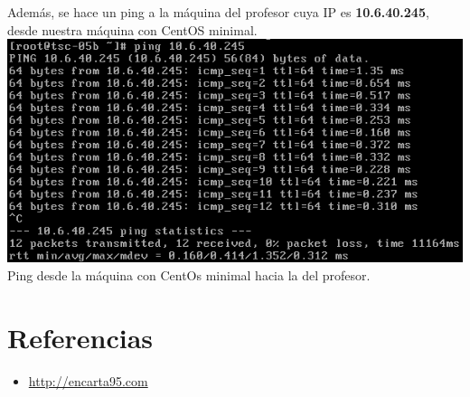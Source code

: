 \documentclass[11pt]{article}
\begin{document}
    Además, se hace un ping a la máquina del profesor cuya IP es \textbf{10.6.40.245}, desde nuestra máquina con CentOS minimal.\\
    
\includegraphics[width=.75\linewidth]{screenshots/minimal/ping-to-profe.png}
    \\Ping desde la máquina con CentOs minimal hacia la del profesor.\\    
\section{Referencias}
	\begin{itemize}
		\item \url{http://encarta95.com}
	\end{itemize}
\end{document}
